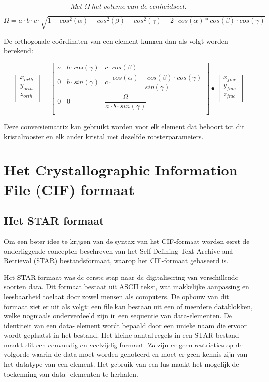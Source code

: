 \par
\[
Met\; \Omega{}\; het\; volume\; van\; de\; eenheidscel.
\]
\par
\[
\Omega{} = a\cdot b \cdot c \cdot \sqrt{1-cos^2(\alpha) - cos^2(\beta) - cos^2(\gamma) + 2 \cdot cos(\alpha) * cos(\beta) \cdot cos(\gamma)}
\]
\par 
De orthogonale coördinaten van een element kunnen dan als volgt worden berekend:
\par
\[
\begin{bmatrix}
    x_{orth} \\
    y_{orth} \\
    z_{orth} \\
\end{bmatrix}
=
\begin{bmatrix}
    a & b \cdot cos(\gamma) & c \cdot cos(\beta) \\
    0 & b \cdot sin(\gamma) & c \cdot \dfrac{cos(\alpha)-cos(\beta) \cdot cos(\gamma)}{sin(\gamma)}  \\
    0 & 0 & \dfrac{\Omega}{a \cdot b \cdot sin(\gamma)}\\
\end{bmatrix}
\bullet
\begin{bmatrix}
    x_{frac} \\
    y_{frac} \\
    z_{frac} \\
\end{bmatrix}
\]
\par
Deze conversiematrix kan gebruikt worden voor elk element dat behoort tot dit kristalrooster en elk ander kristal met dezelfde roosterparameters. 
\par


\section{Het Crystallographic Information File (CIF) formaat}

\subsection{Het STAR formaat}
Om een beter idee te krijgen van de syntax van het CIF-formaat worden eerst de onderliggende concepten beschreven van het Self-Defining Text Archive and Retrieval (STAR) bestandsformaat,  waarop het CIF-formaat gebaseerd is. 
\par
Het STAR-formaat was de eerste stap naar de digitalisering van verschillende soorten data. \citep*{CIF2} Dit formaat bestaat uit ASCII tekst, wat makkelijke aanpassing en leesbaarheid toelaat door zowel mensen als computers. De opbouw van dit formaat ziet er uit als volgt: een file kan bestaan uit een of meerdere datablokken, welke nogmaals onderverdeeld zijn in een sequentie van data-elementen. De identiteit van een data- element wordt bepaald door een unieke naam die ervoor wordt geplaatst in het bestand. Het kleine aantal regels in een STAR-bestand maakt dit een eenvoudig en veelzijdig formaat. Zo zijn er geen restricties op de volgorde waarin de data moet worden genoteerd en moet er geen kennis zijn van het datatype van een element. Het gebruik van een lus maakt het mogelijk de toekenning van data- elementen te herhalen.

